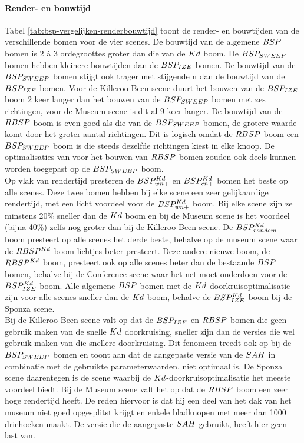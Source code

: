 \paragraph{Render- en bouwtijd}
Tabel \ref{tab:bsp-vergelijken-renderbouwtijd} toont de render- en bouwtijden van de verschillende bomen voor de vier scenes.
De bouwtijd van de algemene $BSP$ bomen is 2 à 3 ordegroottes groter dan die van de $Kd$ boom. 
De $BSP_{SWEEP}$ bomen hebben kleinere bouwtijden dan de $BSP_{IZE}$ bomen.
De bouwtijd van de $BSP_{SWEEP}$ bomen stijgt ook trager met stijgende n dan de bouwtijd van de $BSP_{IZE}$ bomen. 
Voor de Killeroo Been scene duurt het bouwen van de $BSP_{IZE}$ boom 2 keer langer dan het bouwen van de $BSP_{SWEEP}$ bomen met zes richtingen, voor de Museum scene is dit al 9 keer langer. 
De bouwtijd van de $RBSP$ boom is even goed als die van de $BSP_{SWEEP}$ bomen, de grotere waarde komt door het groter aantal richtingen. 
Dit is logisch omdat de $RBSP$ boom een $BSP_{SWEEP}$ boom is die steeds dezelfde richtingen kiest in elke knoop.
De optimalisaties van \authorBudge{} \cite{Budge} voor het bouwen van $RBSP$ bomen zouden ook deels kunnen worden toegepast op de $BSP_{SWEEP}$ boom.
\\

Op vlak van rendertijd presteren de $BSP^{Kd}_{wn+}$ en $BSP^{Kd}_{cn+}$ bomen het beste op alle scenes.
Deze twee bomen hebben bij elke scene een zeer gelijkaardige rendertijd, met een licht voordeel voor de $BSP^{Kd}_{wn+}$ boom.
Bij elke scene zijn ze minstens 20\% sneller dan de $Kd$ boom en bij de Museum scene is het voordeel (bijna 40\%) zelfs nog groter dan bij de Killeroo Been scene.
De $BSP^{Kd}_{random+}$ boom presteert op alle scenes het derde beste, behalve op de museum scene waar de $RBSP^{Kd}$ boom lichtjes beter presteert.
Deze andere nieuwe boom, de $RBSP^{Kd}$ boom, presteert ook op alle scenes beter dan de bestaande $BSP$ bomen, behalve bij de Conference scene waar het net moet onderdoen voor de $BSP^{Kd}_{IZE}$ boom.
Alle algemene $BSP$ bomen met de $Kd$-doorkruisoptimalisatie zijn voor alle scenes sneller dan de $Kd$ boom, behalve de $BSP^{Kd}_{IZE}$ boom bij de Sponza scene.\\

Bij de Killeroo Been scene valt op dat de $BSP_{IZE}$ en $RBSP$ bomen die geen gebruik maken van de snelle $Kd$ doorkruising, sneller zijn dan de versies die wel gebruik maken van die snellere doorkruising.
Dit fenomeen treedt ook op bij de $BSP_{SWEEP}$ bomen en
toont aan dat de aangepaste versie van de $SAH$ in combinatie met de gebruikte parameterwaarden, niet optimaal is.
De Sponza scene daarentegen is de scene waarbij de $Kd$-doorkruisoptimalisatie het meeste voordeel biedt.
Bij de Museum scene valt het op dat de $RBSP$ boom een zeer hoge rendertijd heeft.
De reden hiervoor is dat hij een deel van het dak van het museum niet goed opgesplitst krijgt en enkele bladknopen met meer dan 1000 driehoeken maakt.
De versie die de aangepaste $SAH$ gebruikt, heeft hier geen last van.


